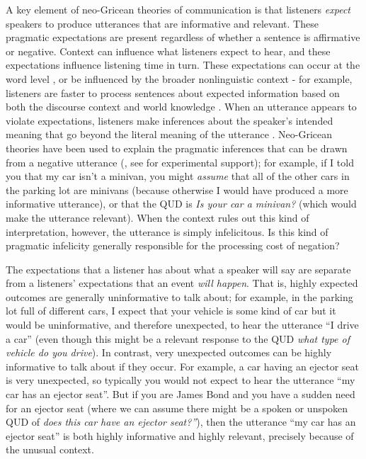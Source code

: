\documentclass[man, floatsintext, noapacite]{apa6}
\begin{document}
A key element of neo-Gricean theories of communication is that listeners \textit{expect} speakers to produce utterances that are informative and relevant. These pragmatic expectations are present regardless of whether a sentence is affirmative or negative. Context can influence what listeners expect to hear, and these expectations influence listening time in turn. These expectations can occur at the word level \cite{hale2001, levy2008}, or be influenced by the broader nonlinguistic context - for example, listeners are faster to process sentences about expected information based on both the discourse context and world knowledge \cite{hald2007, lemke2021}. When an utterance appears to violate expectations, listeners make inferences about the speaker's intended meaning that go beyond the literal meaning of the utterance \cite{kravtchenko2022}. Neo-Gricean theories have been used to explain the pragmatic inferences that can be drawn from a negative utterance (, see  for experimental support); for example, if I told you that my car isn't a minivan, you might \textit{assume} that all of the other cars in the parking lot are minivans (because otherwise I would have produced a more informative utterance), or that the QUD is \textit{Is your car a minivan?} (which would make the utterance relevant).  When the context rules out this kind of interpretation, however, the utterance is simply infelicitous. Is this kind of pragmatic infelicity generally responsible for the processing cost of negation?

The expectations that a listener has about what a speaker will say are separate from a listeners' expectations that an event \textit{will happen}. That is, highly expected outcomes are generally uninformative to talk about; for example, in the parking lot full of different cars, I expect that your vehicle is some kind of car but it would be uninformative, and therefore unexpected, to hear the utterance ``I drive a car'' (even though this might be a relevant response to the QUD \textit{what type of vehicle do you drive}). In contrast, very unexpected outcomes can be highly informative to talk about if they occur. For example, a car having an ejector seat is very unexpected, so typically you would not expect to hear the utterance ``my car has an ejector seat''. But if you are James Bond and you have a sudden need for an ejector seat (where we can assume there might be a spoken or unspoken QUD of \textit{does this car have an ejector seat?''}), then the utterance ``my car has an ejector seat'' is both highly informative and highly relevant, precisely because of the unusual context.
\end{document}
